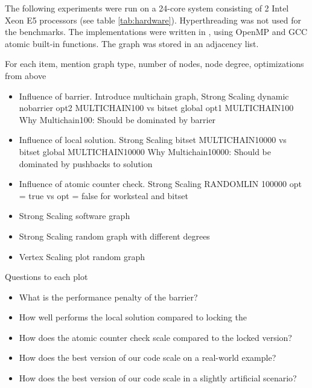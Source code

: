  The following experiments were run on a 24-core system consisting of 2 Intel Xeon E5 processors (see table \ref{tab:hardware}).
 Hyperthreading was not used for the benchmarks.
 The implementations were written in \Cpp, using OpenMP and GCC atomic built-in functions. The graph was stored in an adjacency list.
\begin{invisible}

 For each item, mention graph type, number of nodes, node degree, optimizations from above
 \begin{itemize}
  \item Influence of barrier. Introduce multichain graph, Strong Scaling dynamic nobarrier opt2 MULTICHAIN100 vs bitset global opt1 MULTICHAIN100 Why Multichain100: Should be dominated by barrier%
  \item Influence of local solution. Strong Scaling bitset MULTICHAIN10000 vs bitset global MULTICHAIN10000 Why Multichain10000: Should be dominated by pushbacks to solution
  \item Influence of atomic counter check. Strong Scaling RANDOMLIN 100000 opt = true vs opt = false for worksteal and bitset
  \item Strong Scaling software graph \cite{musco2014generative}
  \item Strong Scaling random graph with different degrees
  \item Vertex Scaling plot random graph
 \end{itemize}


Questions to each plot
\begin{itemize}
 \item What is the performance penalty of the barrier?
 \item How well performs the local solution compared to locking the 
 \item How does the atomic counter check scale compared to the locked version?
 \item How does the best version of our code scale on a real-world example?
 \item How does the best version of our code scale in a slightly artificial scenario?
\end{itemize}
\end{invisible}
